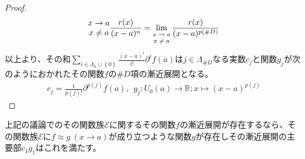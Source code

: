 \documentclass[dvipdfmx]{jsarticle}
\begin{document}
\begin{proof}
\begin{align*}
{\begin{matrix}
x \rightarrow a \\
x \neq a \\
\end{matrix}}\frac{r(x)}{(x - a)^{n}} = \lim_{\scriptsize \begin{matrix}
x \rightarrow a \\
x \neq a \\
\end{matrix}}\frac{r(x)}{(x - a)^{p\left( \#D \right)}}
\end{align*}
以上より、その和$\sum_{i \in \varLambda_{n} \cup \left\{ 0 \right\}} {\frac{(x - a)^{i}}{i!}\partial^{i}f(a)}$は$j \in \varLambda_{\#D}$なる実数$c_{j}$と関数$g_{j}$が次のようにおかれたその関数$f$の$\#D$項の漸近展開となる。
\begin{align*}
c_{j} = \frac{1}{p(j)!}\partial^{p(j)}f(a),\ \ g_{j}:U_{0}(a) \rightarrow \mathbb{R};x \mapsto (x - a)^{p(j)}
\end{align*}
\end{proof}
\begin{thm}\label{4.2.4.6}
上記の議論でのその関数族$\mathcal{E}$に関するその関数$f$の漸近展開が存在するなら、その関数族$\mathcal{E}$に$f \approx g\ (x \rightarrow a)$が成り立つような関数$g$が存在しその漸近展開の主要部$c_{1}g_{1}$はこれを満たす。
\end{thm}
\end{document}
